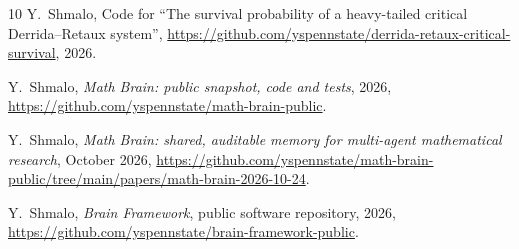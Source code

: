 \documentclass[11pt]{amsart}
\theoremstyle{definition}
\theoremstyle{remark}
\numberwithin{equation}{section}
\begin{document}
\begin{thebibliography}{10}
Y.~Shmalo, Code for ``The survival probability of a heavy-tailed critical Derrida--Retaux system'', \url{https://github.com/yspennstate/derrida-retaux-critical-survival}, 2026.

 Y.~Shmalo, \emph{Math Brain: public snapshot, code and tests}, 2026, \url{https://github.com/yspennstate/math-brain-public}.

 Y.~Shmalo, \emph{Math Brain: shared, auditable memory for multi-agent mathematical research}, October 2026, \url{https://github.com/yspennstate/math-brain-public/tree/main/papers/math-brain-2026-10-24}.

 Y.~Shmalo, \emph{Brain Framework}, public software repository, 2026, \url{https://github.com/yspennstate/brain-framework-public}.

\end{thebibliography}
\end{document}
